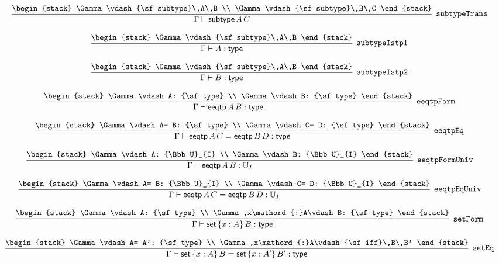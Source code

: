 \[
\infer[{\tt subtypeTrans}]{\Gamma \vdash {\sf subtype}\,A\,C}{
\begin{stack}
\Gamma \vdash {\sf subtype}\,A\,B
\\
\Gamma \vdash {\sf subtype}\,B\,C
\end{stack}}
\]

\[
\infer[{\tt subtypeIstp1}]{\Gamma \vdash A: {\sf type}}{
\begin{stack}
\Gamma \vdash {\sf subtype}\,A\,B
\end{stack}}
\]

\[
\infer[{\tt subtypeIstp2}]{\Gamma \vdash B: {\sf type}}{
\begin{stack}
\Gamma \vdash {\sf subtype}\,A\,B
\end{stack}}
\]

\[
\infer[{\tt eeqtpForm}]{\Gamma \vdash {\sf eeqtp}\,A\,B: {\sf type}}{
\begin{stack}
\Gamma \vdash A: {\sf type}
\\
\Gamma \vdash B: {\sf type}
\end{stack}}
\]

\[
\infer[{\tt eeqtpEq}]{\Gamma \vdash {\sf eeqtp}\,A\,C= {\sf eeqtp}\,B\,D: {\sf type}}{
\begin{stack}
\Gamma \vdash A= B: {\sf type}
\\
\Gamma \vdash C= D: {\sf type}
\end{stack}}
\]

\[
\infer[{\tt eeqtpFormUniv}]{\Gamma \vdash {\sf eeqtp}\,A\,B: {\Bbb U}_{I}}{
\begin{stack}
\Gamma \vdash A: {\Bbb U}_{I}
\\
\Gamma \vdash B: {\Bbb U}_{I}
\end{stack}}
\]

\[
\infer[{\tt eeqtpEqUniv}]{\Gamma \vdash {\sf eeqtp}\,A\,C= {\sf eeqtp}\,B\,D: {\Bbb U}_{I}}{
\begin{stack}
\Gamma \vdash A= B: {\Bbb U}_{I}
\\
\Gamma \vdash C= D: {\Bbb U}_{I}
\end{stack}}
\]

\[
\infer[{\tt setForm}]{\Gamma \vdash {\sf set}\,\{x : A\}\,B: {\sf type}}{
\begin{stack}
\Gamma \vdash A: {\sf type}
\\
\Gamma ,x\mathord{:}A\vdash B: {\sf type}
\end{stack}}
\]

\[
\infer[{\tt setEq}]{\Gamma \vdash {\sf set}\,\{x : A\}\,B= {\sf set}\,\{x : A'\}\,B': {\sf type}}{
\begin{stack}
\Gamma \vdash A= A': {\sf type}
\\
\Gamma ,x\mathord{:}A\vdash {\sf iff}\,B\,B'
\end{stack}}
\]


